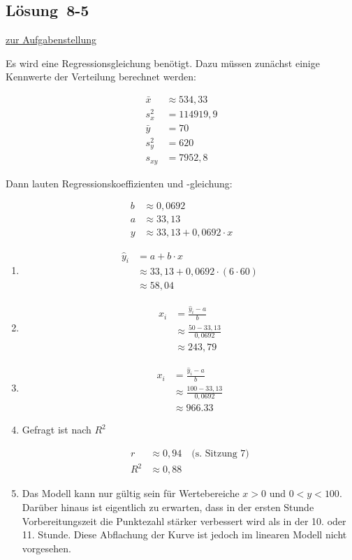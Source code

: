 \documentclass[
  11pt,
  ngerman,
  a4paper,
]{report}
\begin{document}
\hypertarget{loesung-8-5}{%
\subsection{Lösung~8-5}\label{loesung-8-5}}

\protect\hyperlink{aufgabe-8-5}{zur Aufgabenstellung}

Es wird eine Regressionsgleichung benötigt. Dazu müssen zunächst einige Kennwerte der Verteilung berechnet werden:

\[
\begin{aligned}
\bar{x}&\approx534{,}33\\
s^2_x&=114919{,}9\\
\bar{y} &= 70\\
s^2_y &=620\\
s_{xy}&= 7952{,}8
\end{aligned}
\]

Dann lauten Regressionskoeffizienten und -gleichung:

\[
\begin{aligned}
b &\approx 0{,}0692\\
a &\approx 33{,}13\\
y &\approx 33{,}13 + 0{,}0692 \cdot x
\end{aligned}
\]

\begin{enumerate}
\def\labelenumi{\alph{enumi})}
\item
  \[\begin{aligned}
    \hat{y}_i &=a+b\cdot x\\
    &\approx 33{,}13 + 0{,}0692 \cdot (6\cdot 60)\\
    &\approx 58{,}04
    \end{aligned}\]
\item
  \[\begin{aligned}
    x_i&=\frac{\hat{y}_i-a}{b}\\[6pt]
       &\approx\frac{50-33{,}13}{0{,}0692}\\[4pt]
       &\approx 243{,}79
    \end{aligned}\]
\item
  \[\begin{aligned}
    x_i&=\frac{\hat{y}_i-a}{b}\\[6pt]
       &\approx\frac{100-33{,}13}{0{,}0692}\\[4pt]
       &\approx 966.33
    \end{aligned}\]
\item
  Gefragt ist nach \(R^2\)

  \[\begin{aligned}
   r &\approx 0{,}94 \quad \textrm{(s. Sitzung 7)}\\
   R^2 &\approx 0{,}88
   \end{aligned}\]
\item
  Das Modell kann nur gültig sein für Wertebereiche \(x > 0\) und \(0 < y < 100\). Darüber hinaus ist eigentlich zu erwarten, dass in der ersten Stunde Vorbereitungszeit die Punktezahl stärker verbessert wird als in der 10. oder 11. Stunde. Diese Abflachung der Kurve ist jedoch im linearen Modell nicht vorgesehen.
\end{enumerate}
\end{document}
